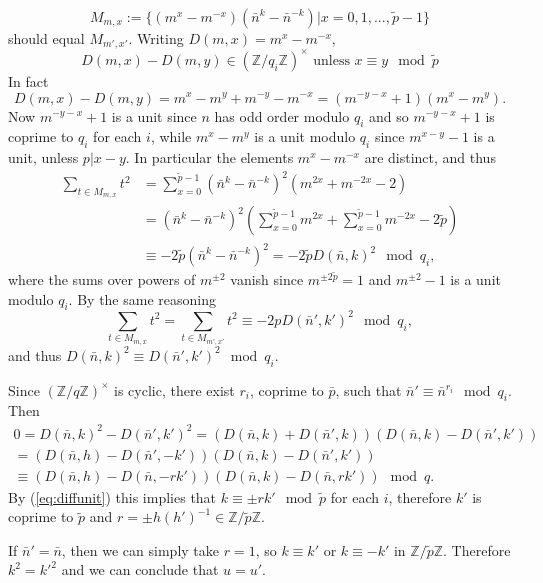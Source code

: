 \documentclass[11pt]{book}
\theoremstyle{Rem}
\theoremstyle{definition}
\numberwithin{equation}{section}
\newcommand\inv{^{-1}}
\newcommand\ZZ{\mathbb Z}
\newcommand{\pb}{\bar{p}}
\newcommand{\nb}{\bar{n}}
\newcommand{\pt}{\tilde{p}}
\newcommand{\nt}{m}
\begin{document}
\begin{equation} 	
	M_{\nt,x}:=\{(\nt^x - \nt^{-x})(\nb^k-\nb^{-k})| x = 0,1,...,\pt-1\} 
\end{equation}
should equal $M_{\nt',x'}$. Writing $D(\nt,x) = \nt^x-\nt^{-x}$, 
\begin{equation}
  \label{eq:diffunit}
  D(\nt,x)-D(\nt,y)\in(\ZZ/q_i\ZZ)^\times \text{ unless }x\equiv y\mod \pt
\end{equation}
In fact
\begin{equation*}
    D(\nt,x)-D(\nt,y)=\nt^x-\nt^y+\nt^{-y}-\nt^{-x}=(\nt^{-y-x}+1)(\nt^x-\nt^y).
 \end{equation*}
 Now $\nt^{-y-x}+1$ is a unit since $n$ has odd order modulo $q_i$ and so $\nt^{-y-x}+1$ is coprime to $q_i$ for each $i$, while $\nt^x-\nt^y$ is a unit modulo $q_i$ since $\nt^{x-y}-1$ is a unit, unless $p|x-y$. In particular the elements $\nt^x-\nt^{-x}$ are distinct, and thus
\begin{align*}
  \sum_{t\in M_{\nt,x}}t^2&=\sum_{x=0}^{\pt-1}(\nb^{k}-\nb^{-k})^2(\nt^{2x}+\nt^{-2x}-2)\\
                  &=(\nb^{k}-\nb^{-k})^2\left(\sum_{x=0}^{\pt-1}\nt^{2x}+\sum_{x=0}^{\pt-1}\nt^{-2x}-2\pt\right)\\
  &\equiv -2\pt(\nb^{k}-\nb^{-k})^2=-2\pt D(\nb,k)^2\mod q_i,
\end{align*}
where the sums over powers of $\nt^{\pm 2}$ vanish since $\nt^{\pm 2\pt}=1$ and $\nt^{\pm 2}-1$ is a unit modulo $q_i$. By the same reasoning
\begin{equation*}
  \sum_{t\in M_{\nt,x}}t^2=\sum_{t\in M_{\nt',x'}}t^2\equiv -2pD(\nb',k')^2\mod q_i,
\end{equation*}
and thus $D(\nb,k)^2\equiv D(\nb',k')^2\mod q_i$.

Since $(\ZZ/q\ZZ)^\times$ is cyclic, there exist $r_i$, coprime to $\pb$, such that $\nb'\equiv \nb^{r_i}\mod q_i$. Then
\begin{multline*} 0=D(\nb,k)^2-D(\nb',k')^2=(D(\nb,k)+D(\nb',k))(D(\nb,k)-D(\nb',k'))\\=(D(\nb,h)-D(\nb',-k'))(D(\nb,k)-D(\nb',k'))\\\equiv(D(\nb,h)-D(\nb,-rk'))(D(\nb,k)-D(\nb,rk'))\mod q.
\end{multline*}
By (\cref{eq:diffunit}) this implies that $k\equiv\pm rk'\mod \pt$ for each $i$, therefore $k'$ is coprime to $\pt$ and $r=\pm h(h')\inv\in\ZZ/\pt\ZZ$.

If $\nb'=\nb$, then we can simply take $r=1$, so $k\equiv k'$ or $k\equiv -k'$ in $\ZZ/\pt\ZZ$. Therefore $k^2=k'^2$ and we can conclude that $u=u'$.
\end{document}
